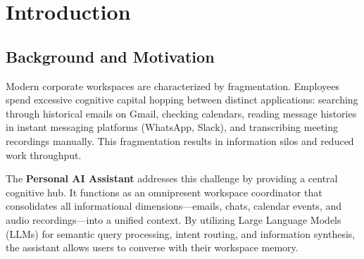 \documentclass[12pt,a4paper]{report}
\begin{document}
\begin{abstract}
This report details the system architecture, design specifications, and operational workflows of the \textbf{Personal AI Assistant for Workplace Productivity}. Built upon a state-of-the-art multi-agent framework (\textbf{GStack}) and integrated with a local vector-relational hybrid knowledge base (\textbf{GBrain}), the assistant serves as an intelligent cognitive extension for modern knowledge workers. By integrating communication gateways like **Discord** and **WhatsApp**, ingestion channels such as the **Google Workspace APIs** (Gmail, Google Calendar) and **Fireflies.ai**, and advanced multimodal LLMs (\textbf{Gemini 1.5 Flash} and \textbf{Gemini 2.5 Flash}), the assistant automates administrative operations, compiles daily productivity reports, prepares preparatory meeting summaries, logs messaging threads, and processes meeting recordings. This document offers a detailed walkthrough of the implementation files, database schemes, network webhooks, daemon pipelines, and cross-platform WSL-to-Windows bridging, providing a production-grade blueprint for collaborative workspaces.
\end{abstract}

\newpage
\tableofcontents

\chapter{Introduction}
\label{chap:introduction}

\section{Background and Motivation}
Modern corporate workspaces are characterized by fragmentation. Employees spend excessive cognitive capital hopping between distinct applications: searching through historical emails on Gmail, checking calendars, reading message histories in instant messaging platforms (WhatsApp, Slack), and transcribing meeting recordings manually. This fragmentation results in information silos and reduced work throughput.

The \textbf{Personal AI Assistant} addresses this challenge by providing a central cognitive hub. It functions as an omnipresent workspace coordinator that consolidates all informational dimensions—emails, chats, calendar events, and audio recordings—into a unified context. By utilizing Large Language Models (LLMs) for semantic query processing, intent routing, and information synthesis, the assistant allows users to converse with their workspace memory.
\end{document}
